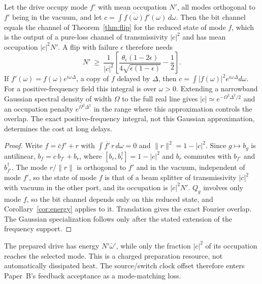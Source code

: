 \begin{proposition}
\label{prop:clock}
Let the drive occupy mode $f'$ with mean occupation $N'$, all modes orthogonal to $f'$ being in the vacuum, and let $c=\int\overline{f(\omega)}f'(\omega)\,d\omega$. Then the bit channel equals the channel of Theorem~\ref{thm:flip} for the reduced state of mode $f$, which is the output of a pure-loss channel of transmissivity $|c|^2$ and has mean occupation $|c|^2N'$. A flip with failure $\epsilon$ therefore needs
\begin{equation}
N'\ \ge\ \frac1{|c|^2}\left[\frac{\theta_\epsilon(1-2\epsilon)}{4\sqrt{\epsilon(1-\epsilon)}}-\frac12\right].
\end{equation}
If $f'(\omega)=f(\omega)e^{i\omega\Delta}$, a copy of $f$ delayed by $\Delta$, then $c=\int|f(\omega)|^2e^{i\omega\Delta}d\omega$. For a positive-frequency field this integral is over $\omega>0$. Extending a narrowband Gaussian spectral density of width $\Omega$ to the full real line gives $|c|\simeq e^{-\Omega^2\Delta^2/2}$ and an occupation penalty $e^{\Omega^2\Delta^2}$ in the range where this approximation controls the overlap. The exact positive-frequency integral, not this Gaussian approximation, determines the cost at long delays.
\end{proposition}

\begin{proof}
Write $f=\bar cf'+r$ with $\int\overline{f'}\,r\,d\omega=0$ and $\|r\|^2=1-|c|^2$. Since $g\mapsto b_g$ is antilinear, $b_f=c\,b_{f'}+b_r$, where $[b_r,b_r^\dagger]=1-|c|^2$ and $b_r$ commutes with $b_{f'}$ and $b_{f'}^\dagger$. The mode $r/\|r\|$ is orthogonal to $f'$ and in the vacuum, independent of mode $f'$, so the state of mode $f$ is that of a beam splitter of transmissivity $|c|^2$ with vacuum in the other port, and its occupation is $|c|^2N'$. $Q_g$ involves only mode $f$, so the bit channel depends only on this reduced state, and Corollary~\ref{cor:energy} applies to it. Translation gives the exact Fourier overlap. The Gaussian specialization follows only after the stated extension of the frequency support.
\end{proof}

The prepared drive has energy $N'\bar\omega'$, while only the fraction
$|c|^2$ of its occupation reaches the selected mode. This is a charged
preparation resource, not automatically dissipated heat.
The source/switch clock offset therefore enters Paper~B's feedback
acceptance as a mode-matching loss.

